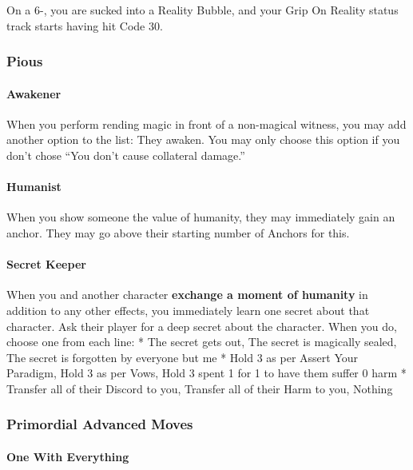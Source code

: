 \documentclass[10pt,twoside,openright]{memoir}
\begin{document}
On a 6-, you are sucked into a Reality Bubble, and your Grip On Reality
status track starts having hit Code 30.

\hypertarget{pious}{%
\subsubsection{Pious}\label{pious}}

\hypertarget{awakener}{%
\paragraph{Awakener}\label{awakener}}

When you perform rending magic in front of a non-magical witness, you
may add another option to the list: They awaken. You may only choose
this option if you don't chose ``You don't cause collateral damage.''

\hypertarget{humanist}{%
\paragraph{Humanist}\label{humanist}}

When you show someone the value of humanity, they may immediately gain
an anchor. They may go above their starting number of Anchors for this.

\hypertarget{secret-keeper}{%
\paragraph{Secret Keeper}\label{secret-keeper}}

When you and another character \textbf{exchange a moment of humanity} in
addition to any other effects, you immediately learn one secret about
that character. Ask their player for a deep secret about the character.
When you do, choose one from each line: * The secret gets out, The
secret is magically sealed, The secret is forgotten by everyone but me *
Hold 3 as per Assert Your Paradigm, Hold 3 as per Vows, Hold 3 spent 1
for 1 to have them suffer 0 harm * Transfer all of their Discord to you,
Transfer all of their Harm to you, Nothing

\hypertarget{primordial-advanced-moves}{%
\subsubsection{Primordial Advanced
Moves}\label{primordial-advanced-moves}}

\hypertarget{one-with-everything}{%
\paragraph{One With Everything}\label{one-with-everything}}
\end{document}
